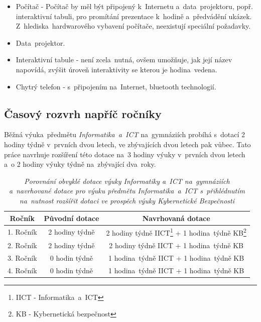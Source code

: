 \documentclass[a4paper, 12pt]{article}
\begin{document}
\begin{itemize}
    \setlength{\itemsep}{-3pt}
    \item Počítač - Počítač by měl být připojený k~Internetu a~data~projektoru, popř. interaktivní tabuli, pro promítání prezentace k~hodině a~předvádění ukázek. Z~hlediska~hardwarového vybavení počítače, neexistují speciální požadavky.
    \item Data~projektor.
    \item Interaktivní tabule - není zcela~nutná, ovšem umožňuje, jak její název napovídá, zvýšit úroveň interaktivity se kterou je hodina~vedena.
    \item Chytrý telefon - s~připojením na~Internet, bluetooth technologií.
\end{itemize}

\subsection{Časový rozvrh napříč ročníky}
Běžná výuka~předmětu \textit{Informatika~a~ICT} na~gymnáziích probíhá s~dotací 2 hodiny týdně v~prvních dvou letech, ve zbývajících dvou letech pak vůbec. Tato práce navrhuje rozšíření této dotace na~3 hodiny výuky v~prvních dvou letech a~o 2 hodiny výuky týdně na~zbývající dva~roky.

\renewcommand*\footnoterule{}
\begin{table}[h!]
\begin{minipage}{\textwidth}
\centering
    \begin{tabular}{|c|c|c|}
    \hline
    \textbf{Ročník} & \textbf{Původní dotace} & \textbf{Navrhovaná dotace} \\
    \hline
    1. Ročník & 2 hodiny týdně & 2 hodiny týdně IICT\footnote[1]{ IICT - Informatika~a~ICT} + 1 hodina~týdně KB\footnote[2]{ KB - Kybernetická bezpečnost} \\
    2. Ročník & 2 hodiny týdně & 2 hodiny týdně IICT + 1 hodina~týdně KB \\
    3. Ročník & 0 hodin týdně & 1 hodina~týdně IICT + 1 hodina~týdně KB  \\
    4. Ročník & 0 hodin týdně & 1 hodina~týdně IICT + 1 hodina~týdně KB  \\
    \hline
    \end{tabular}
    \caption{\textit{Porovnání obvyklé dotace výuky Informatiky a~ICT na~gymnáziích a~navrhované dotace pro výuku předmětu Informatika~a~ICT s~přihlédnutím na~nutnost rozšířit dotaci ve prospěch výuky Kybernetické Bezpečnosti}}
\end{minipage}
\end{table}
\end{document}
